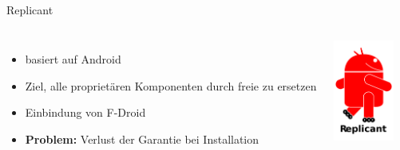 \documentclass[12pt]{beamer}
\begin{document}
\subsection{}
\begin{frame}{Replicant}

\begin{columns}


\column{6cm}
\begin{itemize}
\item basiert auf Android
\item Ziel, alle proprietären Komponenten durch freie zu ersetzen
\item Einbindung von F-Droid
\item \textbf{Problem:} Verlust der Garantie bei Installation
\end{itemize}

\column{5cm}


\begin{center}
\includegraphics[width=2cm]{img/Replicant_logo_alpha}
\par\end{center}

\end{columns}
\end{frame}
\end{document}
